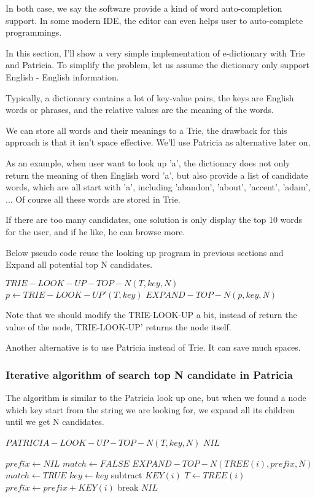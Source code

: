 \documentclass{article}
\begin{document}
In both case, we say the software provide a kind of word auto-completion support. 
In some modern IDE, the editor can even helps user to auto-complete programmings. 

In this section, I'll show a very simple implementation of e-dictionary with Trie
and Patricia.
To simplify the problem, let us assume the dictionary only support English - English
information.

Typically, a dictionary contains a lot of key-value pairs, the keys are English
words or phrases, and the relative values are the meaning of the words.

We can store all words and their meanings to a Trie, the drawback for this 
approach is that it isn't space effective. We'll use Patricia as alternative
later on.

As an example, when user want to look up 'a', the dictionary does not only
return the meaning of then English word 'a', but also provide a list of 
candidate words, which are all start with 'a', including 'abandon', 'about',
'accent', 'adam', ... Of course all these words are stored in Trie.

If there are too many candidates, one solution is only display the top 10
words for the user, and if he like, he can browse more.

Below pseudo code reuse the looking up program in previous sections and
Expand all potential top N candidates.

\begin{algorithmic}
\STATE $TRIE-LOOK-UP-TOP-N(T, key, N)$
  \STATE $p \leftarrow TRIE-LOOK-UP'(T, key)$
  \RETURN $EXPAND-TOP-N(p, key, N)$
\end{algorithmic}

Note that we should modify the TRIE-LOOK-UP a bit, instead of return
the value of the node, TRIE-LOOK-UP' returns the node itself.

Another alternative is to use Patricia instead of Trie. It can save much
spaces.

\subsubsection{Iterative algorithm of search top N candidate in Patricia}

The algorithm is similar to the Patricia look up one, but when we found
a node which key start from the string we are looking for, we expand
all its children until we get N candidates.

\begin{algorithmic}
\STATE $PATRICIA-LOOK-UP-TOP-N(T, key, N)$
     \RETURN $NIL$ \ENDIF

  \STATE $prefix \leftarrow NIL$
  \REPEAT
    \STATE $match \leftarrow FALSE$
        \RETURN $EXPAND-TOP-N(TREE(i), prefix, N)$
      \ENDIF
        \STATE $match \leftarrow TRUE$
        \STATE $key \leftarrow key$ subtract $KEY(i)$
        \STATE $T \leftarrow TREE(i)$
        \STATE $prefix \leftarrow prefix + KEY(i)$
        \STATE break
      \ENDIF
    \ENDFOR
  \RETURN $NIL$
\end{algorithmic}
\end{document}
